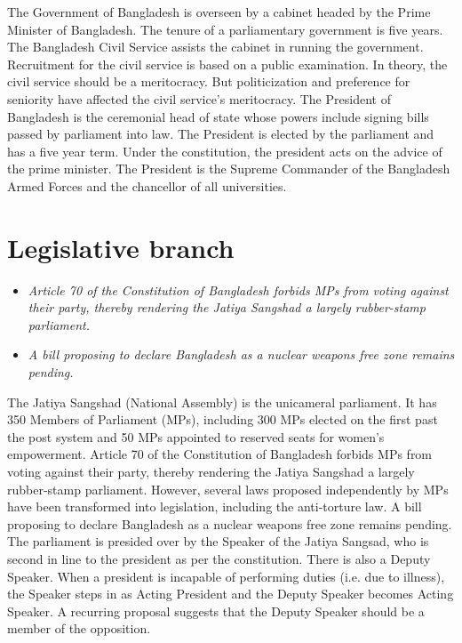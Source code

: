 The Government of Bangladesh is overseen by a cabinet headed by the
Prime Minister of Bangladesh. The tenure of a parliamentary government
is five years. The Bangladesh Civil Service assists the cabinet in
running the government. Recruitment for the civil service is based on a
public examination. In theory, the civil service should be a
meritocracy. But politicization and preference for seniority have
affected the civil service's meritocracy. The President of Bangladesh is
the ceremonial head of state whose powers include signing bills passed
by parliament into law. The President is elected by the parliament and
has a five year term. Under the constitution, the president acts on the
advice of the prime minister. The President is the Supreme Commander of
the Bangladesh Armed Forces and the chancellor of all universities.

\section{Legislative branch}\label{legislative-branch}

\begin{itemize}
\item
  \emph{Article 70 of the Constitution of Bangladesh forbids MPs from
  voting against their party, thereby rendering the Jatiya Sangshad a
  largely rubber-stamp parliament.}
\item
  \emph{A bill proposing to declare Bangladesh as a nuclear weapons free
  zone remains pending.}
\end{itemize}

The Jatiya Sangshad (National Assembly) is the unicameral parliament. It
has 350 Members of Parliament (MPs), including 300 MPs elected on the
first past the post system and 50 MPs appointed to reserved seats for
women's empowerment. Article 70 of the Constitution of Bangladesh
forbids MPs from voting against their party, thereby rendering the
Jatiya Sangshad a largely rubber-stamp parliament. However, several laws
proposed independently by MPs have been transformed into legislation,
including the anti-torture law. A bill proposing to declare Bangladesh
as a nuclear weapons free zone remains pending. The parliament is
presided over by the Speaker of the Jatiya Sangsad, who is second in
line to the president as per the constitution. There is also a Deputy
Speaker. When a president is incapable of performing duties (i.e. due to
illness), the Speaker steps in as Acting President and the Deputy
Speaker becomes Acting Speaker. A recurring proposal suggests that the
Deputy Speaker should be a member of the opposition.

